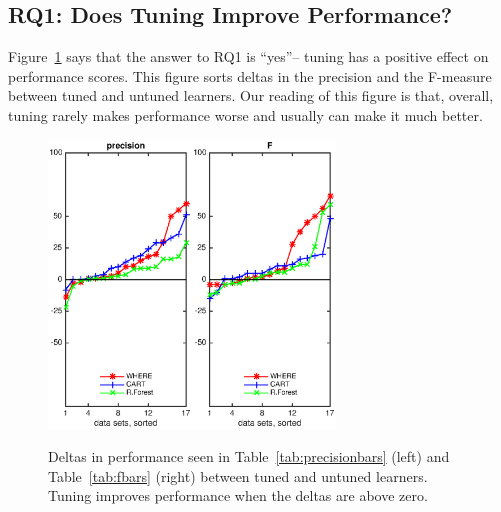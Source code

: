 \documentclass{sig-alternative}
\newcommand{\fig}[1]{Figure~\ref{fig:#1}}
\newcommand{\tab}[1]{Table~\ref{tab:#1}}
\begin{document}
\subsection{RQ1:  Does  Tuning  Improve Performance? }\label{sect:precision}


\fig{deltas} says  that the answer to RQ1 is ``yes''-- tuning  has a positive effect on performance scores. This figure sorts
 deltas in the precision and the F-measure    between tuned and untuned learners. Our reading of this
figure is that, overall, tuning rarely makes performance   worse and usually can make it much better. 
 

\begin{figure}[!t]
\begin{center}
\includegraphics[width=1.5in]{./eps/improvements_precision.eps}\includegraphics[width=1.5in]{./eps/improvements_F.eps}
 \end{center}
\caption{Deltas in performance  seen in \tab{precisionbars} (left)
and \tab{fbars} (right) between tuned and untuned learners. Tuning improves performance when the deltas are above zero.}\label{fig:deltas}
 \end{figure}
 
\end{document}
